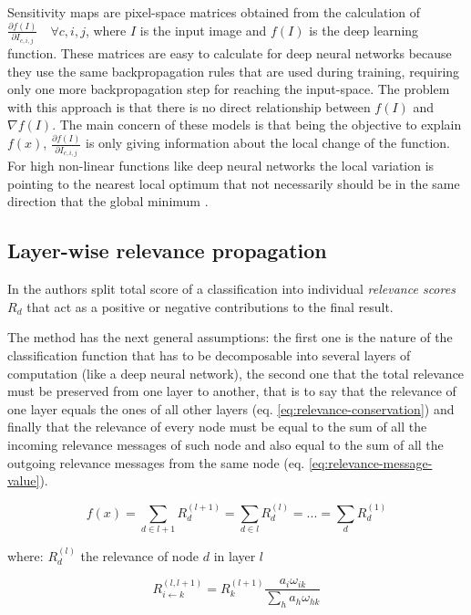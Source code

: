 \documentclass[review]{elsarticle}
\theoremstyle{definition} %
\theoremstyle{remark}
\begin{document}
Sensitivity maps \cite{DBLP:journals/corr/SimonyanVZ13} are pixel-space matrices obtained from the calculation of $ \frac{\partial f(I)}{\partial I_{c,i,j}} \quad \forall c,i,j$, where $I$ is the input image and $f(I)$ is the deep learning function. These matrices are easy to calculate for deep neural networks because they use the same backpropagation rules that are used during training, requiring only one more backpropagation step for reaching the input-space. The problem with this approach is that there is no direct relationship between $f(I)$ and $\nabla f(I)$. The main concern of these models is that being the objective to explain $f(x)$, $ \frac{\partial f(I)}{\partial I_{c,i,j}}$ is only giving information about the local change of the function. For high non-linear functions like deep neural networks the local variation is pointing to the nearest local optimum that not necessarily should be in the same direction that the global minimum \cite{baehrens2010explain}.


\subsection{Layer-wise relevance propagation} 

In \cite{bach2015pixel} the authors split total score of a classification into individual \emph{relevance scores} $R_d$ that act as a positive or negative contributions to the final result. 

The method has the next general assumptions: the first one is the nature of the classification function that has to be decomposable into several layers of computation (like a deep neural network), the second one that the total relevance must be preserved from one layer to another, that is to say that the relevance of one layer equals the ones of all other layers (eq. \ref{eq:relevance-conservation}) and finally that the relevance of every node must be equal to the sum of all the incoming relevance messages of such node and also equal to the sum of all the outgoing relevance messages from the same node (eq. \ref{eq:relevance-message-value}).

\begin{equation}
	f(x) = \sum_{d \in l+1}R_d^{(l+1)} = \sum_{d \in l}R_d^{(l)} = ... = \sum_{d}R_d^{(1)}
	\label{eq:relevance-conservation}
\end{equation}

where: $R_d^{(l)}$ the relevance of node $d$ in layer $l$

\begin{equation}
R_{i \leftarrow k}^{(l,l+1)} = R_k^{(l+1)} \frac{a_i \omega_{ik}}{\sum_{h} a_h \omega_{hk}}
\label{eq:relevance-message-value}
\end{equation}
\end{document}
